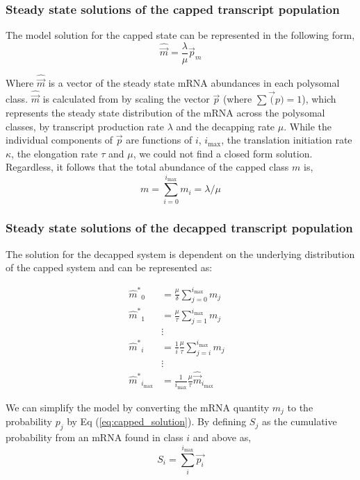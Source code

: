 \documentclass[10pt,letterpaper]{article}
\newcommand{\imax}{\ensuremath{{i_{\max}}}\xspace}
\newcommand{\mhat}{\ensuremath{\hat{m}}\xspace}
\newcommand{\mhatstar}{\ensuremath{\mhat^{*}}\xspace}
\newcommand{\mvec}{\ensuremath{\vec{m}}\xspace}
\newcommand{\mvechat}{\ensuremath{\hat{\mvec}}\xspace}
\newcommand{\msum}{\ensuremath{m}\xspace}
\begin{document}
\subsubsection*{Steady state solutions of the capped transcript population}
The model solution for the capped state can be represented in the following form,
\begin{equation} \label{eq:capped_solution}
  \mvechat=\frac{\lambda}{\mu}\vec{p}_m
\end{equation}

Where \mvechat is a vector of the steady state mRNA abundances in each polysomal class.
\mvechat is calculated from by scaling  the vector $\vec{p}$ (where $\sum \vec(p) = 1$), which represents the steady state distribution of the mRNA across the polysomal classes, by transcript production rate $\lambda$ and the decapping rate $\mu$.
While the individual components of $\vec{p}$ are functions of $i$, \imax, the translation initiation rate $\kappa$, the elongation rate $\tau$ and $\mu$, we could not find a closed form solution.
Regardless, it follows that the total abundance of the capped class \msum is,
\begin{equation}\label{eq:capped_sum}
  \msum = \sum_{i = 0} ^\imax m_i = \lambda/\mu
\end{equation}

\subsubsection*{Steady state solutions of the decapped transcript population}

The solution for the decapped system is dependent on the underlying distribution of the capped system and can be represented as:

\begin{align} 
  \label{eq:decapped_abundance}
  \mhatstar_0  &= \frac{\mu}{\delta}\sum_{j=0}^{\imax}m_{j} \nonumber \\
  \mhatstar_1  &= \frac{\mu}{\tau}\sum_{j=1}^{\imax}m_{j}  \nonumber \\
               & \vdots &  \\
  \mhatstar_i  &= \frac{1}{i}\frac{\mu}{\tau}\sum_{j=i}^{\imax}m_{j}  \nonumber \\
               & \vdots & \nonumber \\
  \mhatstar_{\imax}  &= \frac{1}{\imax}\frac{\mu}{\tau} \mvechat_{\imax}   \nonumber
\end{align}

We can simplify the model by converting the mRNA quantity $m_{j}$ to the probability $p_{j}$ by Eq (\ref{eq:capped_solution}).
By defining $S_{j}$ as the cumulative probability from an mRNA found in class $i$ and above as,
\begin{equation}
  S_{i} = \sum_{i}^{\imax}\vec{p_{i}}
\end{equation}
\end{document}
